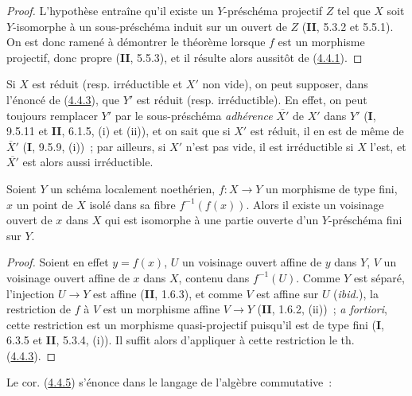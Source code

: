 \begin{proof}
L'hypothèse entraîne qu'il existe un $Y$-préschéma projectif $Z$ tel que $X$
soit $Y$-isomorphe à un sous-préschéma induit sur un ouvert de $Z$
(\textbf{II}, 5.3.2 et 5.5.1). On est donc ramené à démontrer le théorème lorsque $f$
est un morphisme projectif, donc propre (\textbf{II}, 5.5.3), et il résulte alors
aussitôt de (\hyperref[III.4.4.1-fr]{4.4.1}).
\end{proof}

\begin{remark}[4.4.4]
\label{III.4.4.4-fr}
Si $X$ est réduit (resp. irréductible et $X'$ non vide), on peut supposer,
dans l'énoncé de (\hyperref[III.4.4.3-fr]{4.4.3}), que $Y'$ est réduit (resp.
irréductible). En effet, on peut toujours remplacer $Y'$ par le
sous-préschéma \emph{adhérence} $\overline{X'}$ de $X'$ dans $Y'$ (\textbf{I}, 9.5.11 et
\textbf{II}, 6.1.5, (i) et (ii)), et on sait que si $X'$ est réduit, il en est de même
de $\overline{X}'$ (\textbf{I}, 9.5.9, (i))~; par ailleurs, si $X'$ n'est pas vide, il
est irréductible si $X$ l'est, et $\overline{X'}$ est alors aussi
irréductible.
\end{remark}

\begin{corollary}[4.4.5]
\label{III.4.4.5-fr}
Soient $Y$ un schéma localement noethérien, $f:X\to Y$ un morphisme de type
fini, $x$ un point de $X$ isolé dans sa fibre $f^{-1}(f(x))$. Alors il existe
un voisinage ouvert de $x$ dans $X$ qui est isomorphe à une partie ouverte
d'un $Y$-préschéma fini sur $Y$.
\end{corollary}

\begin{proof}
Soient en effet $y=f(x)$, $U$ un voisinage ouvert affine de $y$ dans $Y$,
$V$ un voisinage ouvert affine de $x$ dans $X$, contenu dans $f^{-1}(U)$.
Comme $Y$ est séparé, l'injection $U\to Y$ est affine (\textbf{II}, 1.6.3), et comme
$V$ est affine sur $U$ (\emph{ibid.}), la restriction de $f$ à $V$ est un
morphisme affine $V\to Y$ (\textbf{II}, 1.6.2, (ii))~; \emph{a fortiori}, cette
restriction est un morphisme quasi-projectif puisqu'il est de type fini
(\textbf{I}, 6.3.5 et \textbf{II}, 5.3.4, (i)). Il suffit alors d'appliquer à cette restriction
le th. (\hyperref[III.4.4.3-fr]{4.4.3}).
\end{proof}

Le cor. (\hyperref[III.4.4.5-fr]{4.4.5}) s'énonce dans le langage de
l'algèbre commutative~:

